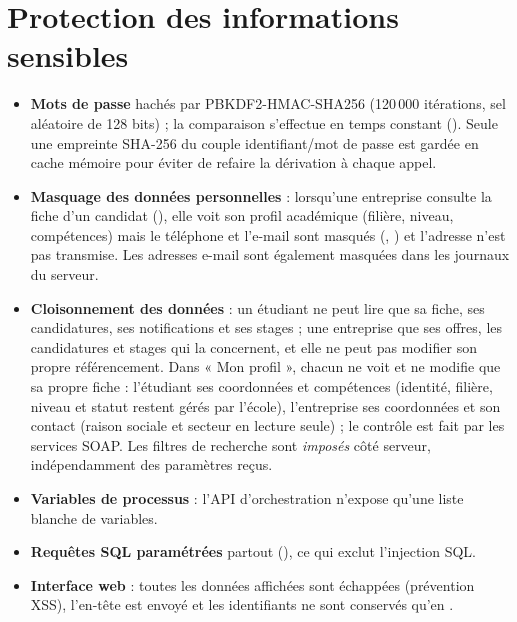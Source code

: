 \section{Protection des informations sensibles}
\begin{itemize}
  \item \textbf{Mots de passe} hachés par PBKDF2-HMAC-SHA256 (120\,000 itérations, sel aléatoire de 128 bits) ;
        la comparaison s'effectue en temps constant (). Seule une empreinte SHA-256 du couple
        identifiant/mot de passe est gardée en cache mémoire pour éviter de refaire la dérivation à chaque appel.
  \item \textbf{Masquage des données personnelles} : lorsqu'une entreprise consulte la fiche d'un candidat
        (), elle voit son profil académique (filière, niveau, compétences) mais le téléphone et
        l'e-mail sont masqués (, ) et l'adresse n'est pas transmise. Les
        adresses e-mail sont également masquées dans les journaux du serveur.
  \item \textbf{Cloisonnement des données} : un étudiant ne peut lire que sa fiche, ses candidatures, ses notifications et
        ses stages ; une entreprise que ses offres, les candidatures et stages qui la concernent, et elle ne peut pas modifier
        son propre référencement. Dans « Mon profil », chacun ne voit et ne modifie que sa propre fiche : l'étudiant ses
        coordonnées et compétences (identité, filière, niveau et statut restent gérés par l'école), l'entreprise ses
        coordonnées et son contact (raison sociale et secteur en lecture seule) ; le contrôle est fait par les services SOAP. Les filtres de recherche sont \emph{imposés} côté serveur, indépendamment des paramètres reçus.
  \item \textbf{Variables de processus} : l'API d'orchestration n'expose qu'une liste blanche de variables.
  \item \textbf{Requêtes SQL paramétrées} partout (), ce qui exclut l'injection SQL.
  \item \textbf{Interface web} : toutes les données affichées sont échappées (prévention XSS), l'en-tête
         est envoyé et les identifiants ne sont conservés qu'en .
\end{itemize}


